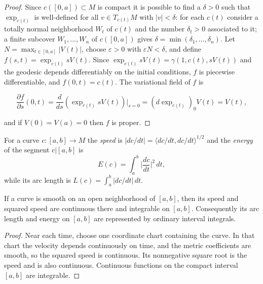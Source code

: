 \begin{proof}
  \sketch
  Since $c([0,a])\subset M$ is compact it is possible to find a $\delta>0$
  such that $\exp_{c(t)}$ is well-defined for all $v\in T_{c(t)}M$ with $|v|<\delta$:
  for each $c(t)$ consider a totally normal neighborhood $W_t$ of $c(t)$ and the
  number $\delta_t>0$ associated to it; a finite subcover
  $W_1,\dots,W_n$ of $c([0,a])$ gives $\delta=\min(\delta_1,\dots,\delta_n)$.
  Let $N=\max_{t\in[0,a]}|V(t)|$, choose $\varepsilon>0$ with
  $\varepsilon N<\delta$, and define
  $f(s,t)=\exp_{c(t)}sV(t)$. Since $\exp_{c(t)}sV(t)=\gamma(1,c(t),sV(t))$ and the
  geodesic depends differentiably on the initial conditions, $f$ is piecewise
  differentiable, and $f(0,t)=c(t)$. The variational field of $f$ is

  $$
  \frac{\partial f}{\partial s}(0,t)=\frac{d}{ds}(\exp_{c(t)}sV(t))\Big|_{s=0}=(d\exp_{c(t)})_0 V(t)=V(t),
  $$

  and if $V(0)=V(a)=0$ then $f$ is proper.
\end{proof}
\begin{definition}
  \label{def:dc-ch9-2-2-energy}


  For a curve $c:[a,b]\to M$ the \emph{speed} is $|dc/dt|=\langle dc/dt,dc/dt\rangle^{1/2}$
  and the \emph{energy} of the segment $c|[a,b]$ is
  $$
  E(c)=\int_a^b\Big|\frac{dc}{dt}\Big|^2\,dt,
  $$
  while its arc length is $L(c)=\int_a^b|dc/dt|\,dt$.
\end{definition}
\begin{lemma}
  \label{lem:dc-ch9-2-2-smooth-speed-integrable}


  If a curve is smooth on an open neighborhood of $[a,b]$, then its speed and
  squared speed are continuous there and integrable on $[a,b]$. Consequently
  its arc length and energy on $[a,b]$ are represented by ordinary interval
  integrals.
\end{lemma}
\begin{proof}

  \sketch
  Near each time, choose one coordinate chart containing the curve. In that
  chart the velocity depends continuously on time, and the metric coefficients
  are smooth, so the squared speed is continuous. Its nonnegative square root
  is the speed and is also continuous. Continuous functions on the compact
  interval $[a,b]$ are integrable.
\end{proof}
